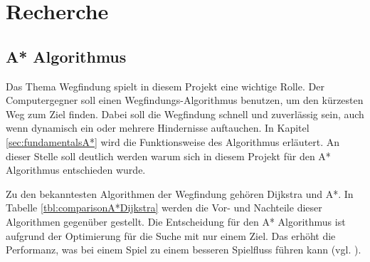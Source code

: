 \chapter{Recherche}
\label{sec:recherche}


\section{A* Algorithmus}
Das Thema Wegfindung spielt in diesem Projekt eine wichtige Rolle. Der Computergegner soll einen Wegfindungs-Algorithmus benutzen, um den kürzesten Weg zum Ziel finden. Dabei soll die Wegfindung schnell und zuverlässig sein, auch wenn dynamisch ein oder mehrere Hindernisse auftauchen. In Kapitel \ref{sec:fundamentalsA*} wird die Funktionsweise des Algorithmus erläutert. An dieser Stelle soll deutlich werden warum sich in diesem Projekt für den A* Algorithmus entschieden wurde.

Zu den bekanntesten Algorithmen der Wegfindung gehören Dijkstra und A*. In Tabelle \ref{tbl:comparisonA*Dijkstra} werden die Vor- und Nachteile dieser Algorithmen gegenüber gestellt. Die Entscheidung für den A* Algorithmus ist aufgrund der Optimierung für die Suche mit nur einem Ziel. Das erhöht die Performanz, was bei einem Spiel zu einem besseren Spielfluss führen kann (vgl. \cite{astar_performance}).


